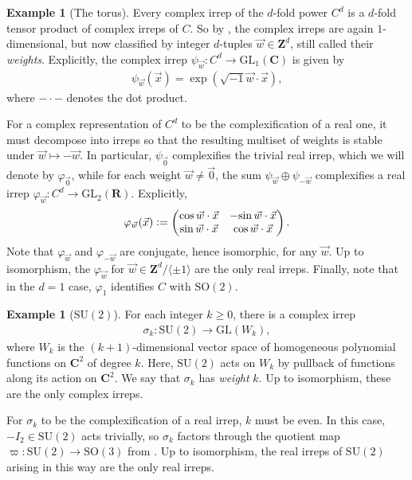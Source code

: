 \documentclass[a4paper,10pt,leqno]{article}
\numberwithin{equation}{section}
\theoremstyle{plain}
\theoremstyle{definition}
\newtheorem{ex}[thm]{Example}
\theoremstyle{remark}
\newcommand{\bb}{\mathbf}
\newcommand{\sapphire}[1]{\textcolor{sapphire}{#1}}
\newcommand{\dfemph}[1]{\sapphire{\emph{#1}}}
\newcommand{\GL}{\mathrm{GL}}
\newcommand{\SU}{\mathrm{SU}}
\newcommand{\SO}{\mathrm{SO}}
\newcommand{\mat}[1]{\begin{matrix}#1\end{matrix}}
\newcommand{\pmat}[1]{\left(\mat{#1}\right)}
\begin{document}
\begin{ex}[The torus]\label{ex:torus}
Every complex irrep of the $d$-fold power $C^d$ is a $d$-fold tensor product of complex irreps of $C$.
So by , the complex irreps are again $1$-dimensional, but now classified by integer $d$-tuples $\vec{w} \in \bb{Z}^d$, still called their \dfemph{weights}.
Explicitly, the complex irrep $\psi_{\vec{w}} \colon C^d \to \GL_1(\bb{C})$ is given by
\begin{align}
\psi_{\vec{w}}(\vec{x}) = \exp(\sqrt{-1}\vec{w} \cdot \vec{x}),
\end{align}
where $- \cdot -$ denotes the dot product.

For a complex representation of $C^d$ to be the complexification of a real one, it must decompose into irreps so that the resulting multiset of weights is stable under $\vec{w} \mapsto -\vec{w}$.
In particular, $\psi_{\vec{0}}$ complexifies the trivial real irrep, which we will denote by $\varphi_{\vec{0}}$, while for each weight $\vec{w} \neq \vec{0}$, the sum $\psi_{\vec{w}} \oplus \psi_{-\vec{w}}$ complexifies a real irrep $\varphi_{\vec{w}} \colon C^d \to \GL_2(\bb{R})$.
Explicitly,
\begin{align} 
\varphi_{\vec{w}}(\vec{x}) \vcentcolon=
	\pmat{
		\cos \vec{w} \cdot \vec{x}
		& -{\sin \vec{w} \cdot \vec{x}}\\ 
		\sin \vec{w} \cdot \vec{x}
		& \cos \vec{w} \cdot \vec{x}
	}.
\end{align} 
Note that $\varphi_{\vec{w}}$ and $\varphi_{-\vec{w}}$ are conjugate, hence isomorphic, for any $\vec{w}$.
Up to isomorphism, the $\varphi_{\vec{w}}$ for $\vec{w} \in \bb{Z}^d/\langle \pm 1\rangle$ are the only real irreps.
Finally, note that in the $d = 1$ case, $\varphi_1$ identifies $C$ with $\SO(2)$.
\end{ex}

\begin{ex}[$\mathrm{SU}(2)$]\label{ex:su-2}
For each integer $k \geq 0$, there is a complex irrep \begin{align} 
\sigma_k \colon \SU(2) \to \GL(W_k),
\end{align} 
where $W_k$ is the $(k + 1)$-dimensional vector space of homogeneous polynomial functions on $\bb{C}^2$ of degree $k$.
Here, $\SU(2)$ acts on $W_k$ by pullback of functions along its action on $\bb{C}^2$.
We say that $\sigma_k$ has \dfemph{weight} $k$.
Up to isomorphism, these are the only complex irreps.

For $\sigma_k$ to be the complexification of a real irrep, $k$ must be even.
In this case, $-I_2 \in \SU(2)$ acts trivially, so $\sigma_k$ factors through the quotient map $\varpi \colon \SU(2) \to \SO(3)$ from .
Up to isomorphism, the real irreps of $\SU(2)$ arising in this way are the only real irreps.
\end{ex}
\end{document}
